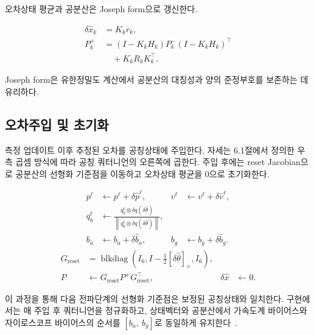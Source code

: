 \documentclass[]{IAC_style}
\begin{document}
오차상태 평균과 공분산은 Joseph form으로 갱신한다.

\begin{equation}
\tag{28}\label{eq:28}
\begin{aligned}
\delta\hat x_k&=K_kr_k,\\
P_k^+
  &=(I-K_kH_k)P_k^-(I-K_kH_k)^\top\\
  &\quad{}+K_kR_kK_k^\top.
\end{aligned}
\end{equation}

Joseph form은 유한정밀도 계산에서 공분산의 대칭성과 양의 준정부호를 보존하는 데 유리하다.

\subsection{오차주입 및 초기화}

측정 업데이트 이후 추정된 오차를 공칭상태에 주입한다. 자세는 6.1절에서 정의한 우측 곱셈 방식에 따라 공칭 쿼터니언의 오른쪽에 곱한다. 주입 후에는 reset Jacobian으로 공분산의 선형화 기준점을 이동하고 오차상태 평균을 0으로 초기화한다.

\begin{equation}
\tag{29a}\label{eq:29a}
\begin{aligned}
p^\ell&\leftarrow p^\ell+\delta\hat p^\ell,
&v^\ell&\leftarrow v^\ell+\delta\hat v^\ell,\\
q_b^\ell&\leftarrow
  \frac{q_b^\ell\otimes\delta q(\delta\hat\theta)}
  {\left\lVert q_b^\ell\otimes\delta q(\delta\hat\theta)\right\rVert},\\
b_a&\leftarrow b_a+\delta\hat b_a,
&b_g&\leftarrow b_g+\delta\hat b_g.
\end{aligned}
\end{equation}
\begin{equation}
\tag{29b}\label{eq:29b}
\begin{aligned}
G_{\mathrm{reset}}
  &=\operatorname{blkdiag}\!\left(
    I_6,I-\tfrac12[\delta\hat\theta]_\times,I_6\right),\\
P&\leftarrow G_{\mathrm{reset}}P^+G_{\mathrm{reset}}^\top,
&\delta\hat x&\leftarrow0.
\end{aligned}
\end{equation}

이 과정을 통해 다음 전파단계의 선형화 기준점은 보정된 공칭상태와 일치한다. 구현에서는 매 주입 후 쿼터니언을 정규화하고, 상태벡터와 공분산에서 가속도계 바이어스와 자이로스코프 바이어스의 순서를 $[b_a,\ b_g]$로 동일하게 유지한다~\cite{sola2017quaternion}.
\end{document}

